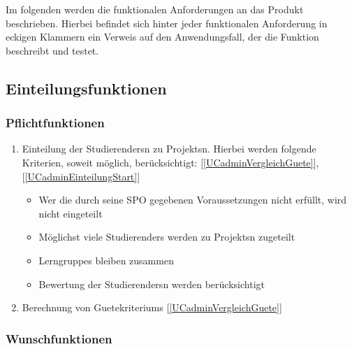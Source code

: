 \documentclass[parskip=full]{scrartcl}
\newcommand{\swtLabel}[1]{\textbf{/#1\arabic*0/}}
\newcommand{\testRef}[1]{[\ref{#1}]}
\begin{document}
Im folgenden werden die funktionalen Anforderungen an das Produkt beschrieben.
Hierbei befindet sich hinter jeder funktionalen Anforderung in eckigen Klammern
ein Verweis auf den Anwendungsfall, der die Funktion beschreibt und testet.

\subsection{Einteilungsfunktionen}
\subsubsection{Pflichtfunktionen}
\begin{enumerate}[label=\swtLabel{FA}]
  \item \gls{Einteilung} der \glspl{Studierender}n zu \glspl{Projekt}n. Hierbei werden
  folgende Kriterien, soweit möglich, berücksichtigt: \testRef{UCadminVergleichGuete},
  \testRef{UCadminEinteilungStart}
  \begin{itemize}
    \item Wer die durch seine \gls{SPO} gegebenen Voraussetzungen nicht erfüllt,
    wird nicht eingeteilt \label{FAeinteilung}
    \item Möglichst viele \glspl{Studierender} werden zu \glspl{Projekt}n zugeteilt 
    \item \glspl{Lerngruppe} bleiben zusammen
    \item \gls{Bewertung} der \glspl{Studierender}n werden berücksichtigt 
 \end{itemize} \label{FAeinteilungMussKriterien} 
 \item Berechnung von \glspl{Guetekriterium} \label{FAguetekriterien}
 \testRef{UCadminVergleichGuete}
 
\end{enumerate}

 \subsubsection{Wunschfunktionen}
 
\end{document}
